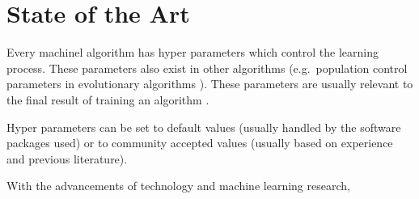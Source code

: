 
\section{State of the Art}

Every \acrshort{machinel} algorithm has hyper parameters \parencite[ch.\ 1]{Feurer2019} which control the learning process. These parameters also exist in other algorithms (e.g.\ population control parameters in evolutionary algorithms \parencite{ptuningevo2011}). These parameters are usually relevant to the final result of training an algorithm \parencite{Bergstra2012}.

Hyper parameters can be set to default values (usually handled by the software packages used) or to community accepted values (usually based on experience and previous literature).

With the advancements of technology and machine learning research, 




